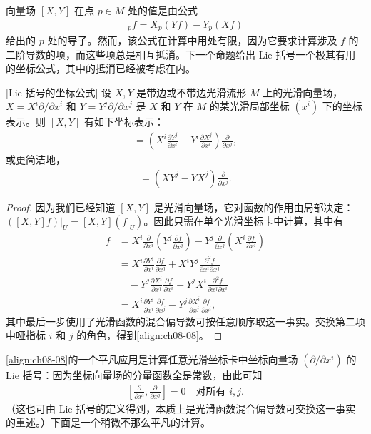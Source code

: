 \documentclass[../../main.tex]{subfiles}
\begin{document}
向量场 $[X,Y]$ 在点 $p\in M$ 处的值是由公式
\begin{align*}
[X,Y]_pf=X_p(Yf)-Y_p(Xf)
\end{align*}
给出的 $p$ 处的导子。然而，该公式在计算中用处有限，因为它要求计算涉及 $f$ 的二阶导数的项，而这些项总是相互抵消。下一个命题给出 Lie 括号一个极其有用的坐标公式，其中的抵消已经被考虑在内。

\begin{proposition}\label{proposition:ch08-26}[Lie 括号的坐标公式]
设 $X,Y$ 是带边或不带边光滑流形 $M$ 上的光滑向量场，$X=X^i\partial/\partial x^i$ 和 $Y=Y^j\partial/\partial x^j$ 是 $X$ 和 $Y$ 在 $M$ 的某光滑局部坐标 $(x^i)$ 下的坐标表示。则 $[X,Y]$ 有如下坐标表示：
\begin{align}
[X,Y]=\left(X^i\frac{\partial Y^j}{\partial x^i}-Y^i\frac{\partial X^j}{\partial x^i}\right)\frac{\partial}{\partial x^j},\label{align:ch08-08}
\end{align}
或更简洁地，
\begin{align}
[X,Y]=(XY^j-YX^j)\frac{\partial}{\partial x^j}.\label{align:ch08-09}
\end{align}
\end{proposition}

\begin{proof}
因为我们已经知道 $[X,Y]$ 是光滑向量场，它对函数的作用由局部决定：$([X,Y]f)|_U=[X,Y](f|_U)$。因此只需在单个光滑坐标卡中计算，其中有
\begin{align*}
[X,Y]f&=X^i\frac{\partial}{\partial x^i}\left(Y^j\frac{\partial f}{\partial x^j}\right)-Y^j\frac{\partial}{\partial x^j}\left(X^i\frac{\partial f}{\partial x^i}\right)\\
&=X^i\frac{\partial Y^j}{\partial x^i}\frac{\partial f}{\partial x^j}+X^iY^j\frac{\partial^2 f}{\partial x^i\partial x^j}\\
&\quad -Y^j\frac{\partial X^i}{\partial x^j}\frac{\partial f}{\partial x^i}-Y^jX^i\frac{\partial^2 f}{\partial x^j\partial x^i}\\
&=X^i\frac{\partial Y^j}{\partial x^i}\frac{\partial f}{\partial x^j}-Y^j\frac{\partial X^i}{\partial x^j}\frac{\partial f}{\partial x^i},
\end{align*}
其中最后一步使用了光滑函数的混合偏导数可按任意顺序取这一事实。交换第二项中哑指标 $i$ 和 $j$ 的角色，得到\eqref{align:ch08-08}。
\end{proof}

\eqref{align:ch08-08}的一个平凡应用是计算任意光滑坐标卡中坐标向量场 $(\partial/\partial x^i)$ 的 Lie 括号：因为坐标向量场的分量函数全是常数，由此可知
\begin{align}
\left[\frac{\partial}{\partial x^i},\frac{\partial}{\partial x^j}\right]=0\quad\text{对所有 }i,j.\label{align:ch08-10}
\end{align}
（这也可由 Lie 括号的定义得到，本质上是光滑函数混合偏导数可交换这一事实的重述。）下面是一个稍微不那么平凡的计算。
\end{document}
